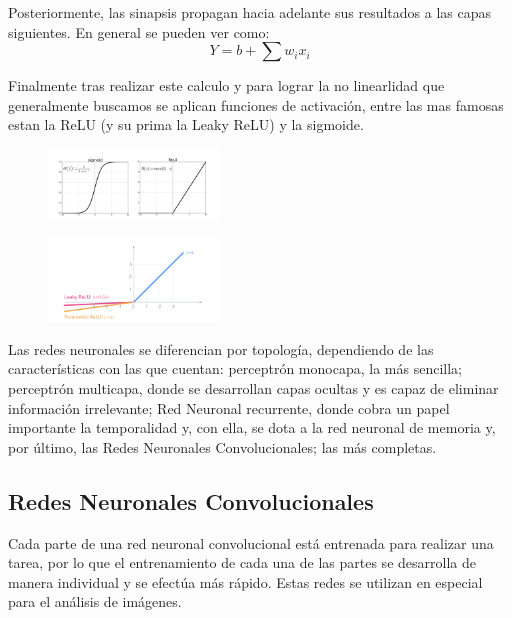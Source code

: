 \documentclass[10pt, fleqn, journal]{IEEEtran}
\theoremstyle{break}                                            %
\begin{document}
      Posteriormente, las sinapsis propagan hacia adelante sus resultados a las capas siguientes.
      En general se pueden ver como:
      \begin{equation}
          Y = b + \sum{w_i x_i}
      \end{equation}

      Finalmente tras realizar este calculo y para lograr la no linearlidad que generalmente buscamos
      se aplican funciones de activación, entre las mas famosas estan la ReLU (y su prima la Leaky ReLU) y la sigmoide.

      \begin{figure}[h!]
        \includegraphics[width=0.4\textwidth]{activation}
      \end{figure}

      \cite{photos}

      \begin{figure}[h!]
        \includegraphics[width=0.4\textwidth]{leaky}
      \end{figure}

      \cite{photos}

      Las redes neuronales se diferencian por topología, dependiendo de las características con las 
      que cuentan: perceptrón monocapa, la más sencilla; perceptrón multicapa, donde se desarrollan 
      capas ocultas y es capaz de eliminar información irrelevante; Red Neuronal recurrente, donde 
      cobra un papel importante la temporalidad y, con ella, se dota a la red neuronal de memoria 
      y, por último, las Redes Neuronales Convolucionales; las más completas.
  
    \subsection{Redes Neuronales Convolucionales}
      Cada parte de una red neuronal convolucional está entrenada para realizar una tarea, 
      por lo que el entrenamiento de cada una de las partes se desarrolla de manera individual y 
      se efectúa más rápido. Estas redes se utilizan en especial para el análisis de imágenes.
\end{document}
